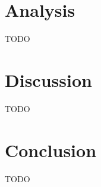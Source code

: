 \documentclass{article}
\begin{document}
    \section{Analysis}
    TODO

    \section{Discussion}
    TODO

    \section{Conclusion}
    TODO
\end{document}
